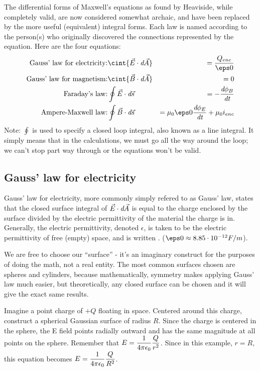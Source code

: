 \documentclass[12pt]{article}
\begin{document}
\indent The differential forms of Maxwell's equations as found by Heaviside, while completely valid, are now considered somewhat archaic, and have been replaced by the more useful (equivalent) integral forms. Each law is named according to the person(s) who originally discovered the connections represented by the equation. Here are the four equations:
\begin{eqnarray}
\text{Gauss' law for electricity:}& \displaystyle \cint{\vec{E}\cdot\dA}&=\frac{Q_{enc}}{\eps0}\\
\text{Gauss' law for magnetism:}& \displaystyle \cint{\vec{B}\cdot\dA}&=0\\
\text{Faraday's law:}& \displaystyle\oint{\vec{E}\cdot\ds}&=-\frac{\dphib}{\dt}\\
\text{Ampere-Maxwell law:}& \displaystyle\oint{\vec{B}\cdot\ds}&=\muz\eps0\frac{\dphie}{\dt}+\muz i_{enc}
\end{eqnarray}
Note: $\oint$ is used to specify a closed loop integral, also known as a line integral. It simply means that in the calculations, we must go all the way around the loop; we can't stop part way through or the equations won't be valid.

\subsection{Gauss' law for electricity}

\indent Gauss' law for electricity, more commonly simply refered to as Gauss' law, states that the closed surface integral of $\vec{E}\cdot\emph{d}\vec{A}$ is equal to the charge enclosed by the surface divided by the electric permittivity of the material the charge is in. Generally, the electric permittivity, denoted $\epsilon$, is taken to be the electric permittivity of free (empty) space, and is written . ($\eps0\approx 8.85\cdot10^{-12} F/m$).

We are free to choose our ``surface'' - it's an imaginary construct for the purposes of doing the math, not a real entity. The most common surfaces chosen are spheres and cylinders, because mathematically, symmetry makes applying Gauss' law much easier, but theoretically, any closed surface can be chosen and it will give the exact same results.

Imagine a point charge of $+Q$ floating in space. Centered around this charge, construct a spherical Gaussian surface of radius $R$. Since the charge is centered in the sphere, the E field points radially outward and has the same magnitude at all points on the sphere. Remember that $\displaystyle E = \displaystyle \frac{1}{4\pi \epsilon _0} \frac{Q}{r^2}$. Since in this example, $r=R$, this equation becomes $\displaystyle E = \displaystyle \frac{1}{4\pi \epsilon _0} \frac{Q}{R^2}$. 
\end{document}
